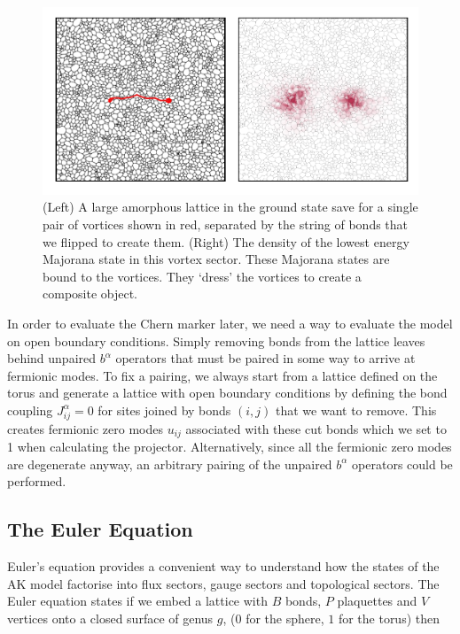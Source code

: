 \hypertarget{fig:majorana_bound_states}{%
\begin{figure}
\centering
\includegraphics[width=1\textwidth,height=\textheight]{figure_code/amk_chapter/majorana_bound_states/majorana_bound_states}
\caption[{Majorana Bound States}]{(Left) A large amorphous lattice in the ground state save for a single pair of vortices shown in red, separated by the string of bonds that we flipped to create them. (Right) The density of the lowest energy Majorana state in this vortex sector. These Majorana states are bound to the vortices. They `dress' the vortices to create a composite object.}
\label{fig:majorana_bound_states}
\end{figure}
}

In order to evaluate the Chern marker later, we need a way to evaluate the model on open boundary conditions. Simply removing bonds from the lattice leaves behind unpaired \(b^\alpha\) operators that must be paired in some way to arrive at fermionic modes. To fix a pairing, we always start from a lattice defined on the torus and generate a lattice with open boundary conditions by defining the bond coupling \(J^{\alpha}_{ij} = 0\) for sites joined by bonds \((i,j)\) that we want to remove. This creates fermionic zero modes \(u_{ij}\) associated with these cut bonds which we set to 1 when calculating the projector. Alternatively, since all the fermionic zero modes are degenerate anyway, an arbitrary pairing of the unpaired \(b^\alpha\) operators could be performed.

\hypertarget{the-euler-equation}{%
\subsection{The Euler Equation}\label{the-euler-equation}}

Euler's equation provides a convenient way to understand how the states of the AK model factorise into flux sectors, gauge sectors and topological sectors. The Euler equation states if we embed a lattice with \(B\) bonds, \(P\) plaquettes and \(V\) vertices onto a closed surface of genus \(g\), (\(0\) for the sphere, \(1\) for the torus) then

